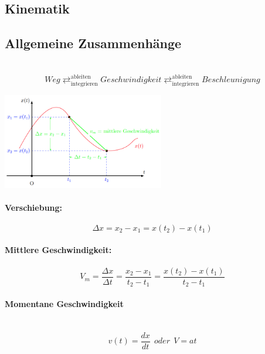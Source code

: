 \documentclass[7pt]{article}
\begin{document}
\begin{multicols}{3}

\section{Kinematik}

\subsection{Allgemeine Zusammenh{\"a}nge}
\mbox{} \\
\[Weg \mathrel{\mathop{\rightleftarrows}^{\mathrm{ableiten}}_{\mathrm{integrieren}}} Geschwindigkeit \mathrel{\mathop{\rightleftarrows}^{\mathrm{ableiten}}_{\mathrm{integrieren}}} Beschleunigung\]
\newline

\begin{center}
	\includegraphics[width=200pt]{images/kinematik}
\end{center}

\paragraph{Verschiebung:}
\begin{equation*}
	{\Delta}x = x_2 - x_1 = x(t_2) - x(t_1) 
\end{equation*}

\paragraph{Mittlere Geschwindigkeit:}
\begin{equation*}
	V_m = \frac{{\Delta}x}{{\Delta}t} =  \frac{x_2 - x_1}{t_2 - t_1} = \frac{x(t_2) - x(t_1)}{t_2 - t_1}
\end{equation*}

\paragraph{Momentane Geschwindigkeit}\mbox{} \\
\begin{equation*}
	v(t) = \frac{dx}{dt}	 \>\>oder\>\> V = at
\end{equation*}


\end{multicols}
\end{document}
